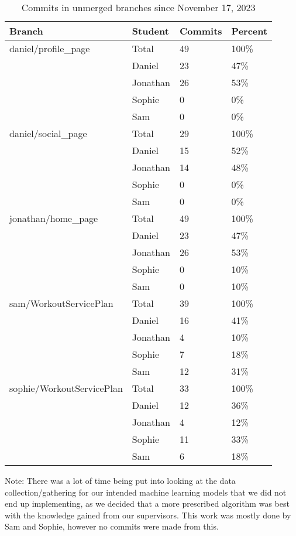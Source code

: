 \documentclass{article}
\begin{document}
\begin{table}[H]
\centering
\begin{tabular}{llll}
\toprule
\textbf{Branch} & \textbf{Student} & \textbf{Commits} & \textbf{Percent}\\
\midrule
daniel/profile\_page & Total & 49 & 100\% \\
& Daniel & 23 & 47\% \\
& Jonathan & 26 & 53\% \\
& Sophie & 0 & 0\% \\
& Sam & 0 & 0\% \\
\hline
daniel/social\_page & Total & 29 & 100\% \\
& Daniel & 15 & 52\% \\
& Jonathan & 14 & 48\% \\
& Sophie & 0 & 0\% \\
& Sam & 0 & 0\% \\
\hline
jonathan/home\_page & Total & 49 & 100\% \\
& Daniel & 23 & 47\% \\
& Jonathan & 26 & 53\% \\
& Sophie & 0 & 10\% \\
& Sam & 0 & 10\% \\
\hline
sam/WorkoutServicePlan & Total & 39 & 100\% \\
& Daniel & 16 & 41\% \\
& Jonathan & 4 & 10\% \\
& Sophie & 7 & 18\% \\
& Sam & 12 & 31\% \\
\hline
sophie/WorkoutServicePlan & Total & 33 & 100\% \\
& Daniel & 12 & 36\% \\
& Jonathan & 4 & 12\% \\
& Sophie & 11 & 33\% \\
& Sam & 6 & 18\% \\
\bottomrule
\end{tabular}
\caption{Commits in unmerged branches since November 17, 2023}
\end{table}

Note: There was a lot of time being put into looking at the data collection/gathering for our intended machine learning models that we did not end up implementing, as we decided that a more prescribed algorithm was best with the knowledge gained from our supervisors. This work was mostly done by Sam and Sophie, however no commits were made from this. 
\end{document}
